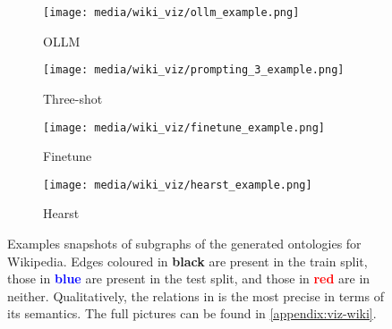 \begin{figure}[t]
    \centering
    \begin{subfigure}[c]{0.48\textwidth}
        \centering
        \texttt{[image: media/wiki\_viz/ollm\_example.png]}
        \caption{OLLM}
        \label{fig:wiki-examples:ollm}
    \end{subfigure}%
    \hfill%
    \begin{subfigure}[c]{0.48\textwidth}
        \centering
        \texttt{[image: media/wiki\_viz/prompting\_3\_example.png]}
        \caption{Three-shot}
        \label{fig:wiki-examples:prompting}
    \end{subfigure}%
    \hfill%
    \begin{subfigure}[c]{0.48\textwidth}
        \centering
        \texttt{[image: media/wiki\_viz/finetune\_example.png]}
        \caption{Finetune}
    \end{subfigure}%
    \hfill%
    \begin{subfigure}[c]{0.48\textwidth}
        \centering
        \texttt{[image: media/wiki\_viz/hearst\_example.png]}
        \caption{Hearst}
    \end{subfigure}%
    \caption{Examples snapshots of subgraphs of the generated ontologies for Wikipedia. Edges coloured in \textbf{black} are present in the train split, those in \textcolor{blue}{\textbf{blue}} are present in the test split, and those in \textcolor{red}{\textbf{red}} are in neither. Qualitatively, the relations in \name is the most precise in terms of its semantics. The full pictures can be found in \cref{appendix:viz-wiki}.}
    \label{fig:wiki-examples}
\end{figure}